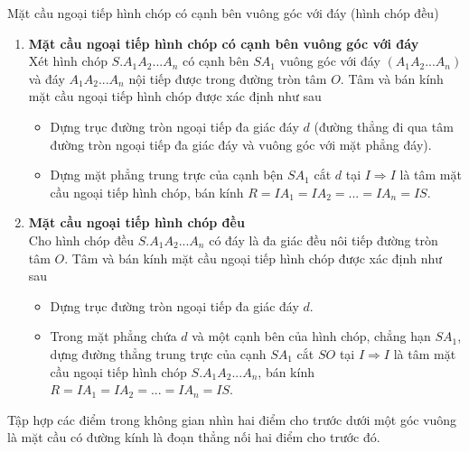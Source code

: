 









\begin{dang}{Mặt cầu ngoại tiếp hình chóp có cạnh bên vuông góc với đáy (hình chóp đều)}
\begin{enumerate}[1)]
\item {\bf Mặt cầu ngoại tiếp hình chóp có cạnh bên vuông góc với đáy}\\
Xét hình chóp $S.A_1A_2...A_n$ có cạnh bên $SA_1$ vuông góc với đáy $(A_1A_2...A_n)$ và đáy $A_1A_2...A_n$ nội tiếp được trong đường tròn tâm $O$. Tâm và bán kính mặt cầu ngoại tiếp hình chóp được xác định như sau
\begin{itemize}
\item Dựng trục đường tròn ngoại tiếp đa giác đáy $d$ (đường thẳng đi qua tâm đường tròn ngoại tiếp đa giác đáy và vuông góc với mặt phẳng đáy).
\item Dựng mặt phẳng trung trực của cạnh bện $SA_1$ cắt $d$ tại $I\Rightarrow I$ là tâm mặt cầu ngoại tiếp hình chóp, bán kính $R=IA_1=IA_2=...=IA_n=IS$.
\end{itemize}
\item {\bf Mặt cầu ngoại tiếp hình chóp đều}\\
Cho hình chóp đều $S.A_1A_2...A_n$ có đáy là đa giác đều nôi tiếp đường tròn tâm $O$. Tâm và bán kính mặt cầu ngoại tiếp hình chóp được xác định như sau
\begin{itemize}
\item Dựng trục đường tròn ngoại tiếp đa giác đáy $d$.
\item Trong mặt phẳng chứa $d$ và một cạnh bên của hình chóp, chẳng hạn $SA_1$, dựng đường thẳng trung trực của cạnh $SA_1$ cắt $SO$ tại $I\Rightarrow I$ là tâm mặt cầu ngoại tiếp hình chóp $S.A_1A_2...A_n$, bán kính $R=IA_1=IA_2=...=IA_n=IS$.
\end{itemize}
\end{enumerate}
\begin{note}
Tập hợp các điểm trong không gian nhìn hai điểm cho trước dưới một góc vuông là mặt cầu có đường kính là đoạn thẳng nối hai điểm cho trước đó.
\end{note}
\end{dang}

